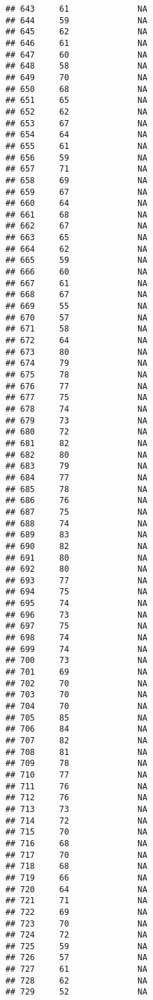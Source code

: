 \documentclass[]{article}
\begin{document}
\begin{verbatim}
## 643     61              NA
## 644     59              NA
## 645     62              NA
## 646     61              NA
## 647     60              NA
## 648     58              NA
## 649     70              NA
## 650     68              NA
## 651     65              NA
## 652     62              NA
## 653     67              NA
## 654     64              NA
## 655     61              NA
## 656     59              NA
## 657     71              NA
## 658     69              NA
## 659     67              NA
## 660     64              NA
## 661     68              NA
## 662     67              NA
## 663     65              NA
## 664     62              NA
## 665     59              NA
## 666     60              NA
## 667     61              NA
## 668     67              NA
## 669     55              NA
## 670     57              NA
## 671     58              NA
## 672     64              NA
## 673     80              NA
## 674     79              NA
## 675     78              NA
## 676     77              NA
## 677     75              NA
## 678     74              NA
## 679     73              NA
## 680     72              NA
## 681     82              NA
## 682     80              NA
## 683     79              NA
## 684     77              NA
## 685     78              NA
## 686     76              NA
## 687     75              NA
## 688     74              NA
## 689     83              NA
## 690     82              NA
## 691     80              NA
## 692     80              NA
## 693     77              NA
## 694     75              NA
## 695     74              NA
## 696     73              NA
## 697     75              NA
## 698     74              NA
## 699     74              NA
## 700     73              NA
## 701     69              NA
## 702     70              NA
## 703     70              NA
## 704     70              NA
## 705     85              NA
## 706     84              NA
## 707     82              NA
## 708     81              NA
## 709     78              NA
## 710     77              NA
## 711     76              NA
## 712     76              NA
## 713     73              NA
## 714     72              NA
## 715     70              NA
## 716     68              NA
## 717     70              NA
## 718     68              NA
## 719     66              NA
## 720     64              NA
## 721     71              NA
## 722     69              NA
## 723     70              NA
## 724     72              NA
## 725     59              NA
## 726     57              NA
## 727     61              NA
## 728     62              NA
## 729     52              NA

\end{verbatim}
\end{document}
